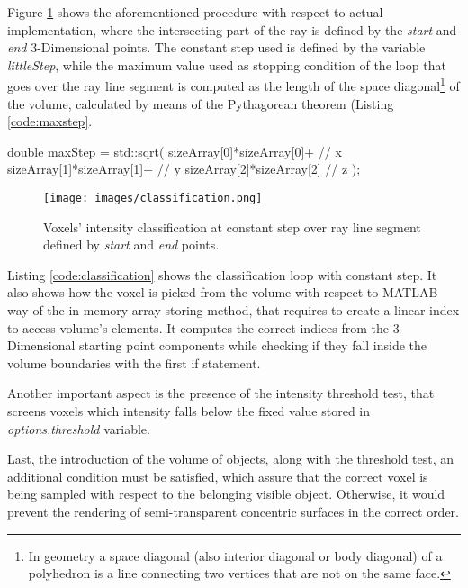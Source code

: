 \documentclass[12pt,a4paper]{extarticle}
\begin{document}
Figure \ref{fig:segmentclassify} shows the aforementioned procedure with respect to actual implementation, where the intersecting part of the ray is defined by the \textit{start} and \textit{end} 3-Dimensional points.
The constant step used is defined by the variable \textit{littleStep}, while the maximum value used as stopping condition of the loop that goes over the ray line segment is computed as the length of the space diagonal\footnote{In geometry a space diagonal (also interior diagonal or body diagonal) of a polyhedron is a line connecting two vertices that are not on the same face.\cite{space_diagonal:6}} of the volume, calculated by means of the Pythagorean theorem (Listing \ref{code:maxstep}.

\begin{cpp}[caption={Computed volume's space diagonal by means of the \textit{"Pythagorean formula"}, where \textit{sizeArray} is an array storing the volume sizes in each 3-Dimensional dimension.},label=code:maxstep]
double maxStep = std::sqrt(
						sizeArray[0]*sizeArray[0]+ // x
						sizeArray[1]*sizeArray[1]+ // y
						sizeArray[2]*sizeArray[2]  // z
						);
\end{cpp}

\begin{figure}[hbtp]
\centering
\texttt{[image: images/classification.png]}
\caption{Voxels' intensity classification at constant step over ray line segment defined by \textit{start} and \textit{end} points.}
\label{fig:segmentclassify}
\end{figure}

Listing \ref{code:classification} shows the classification loop with constant step. It also shows how the voxel is picked from the volume with respect to MATLAB way of the in-memory array storing method, that requires to create a linear index to access volume's elements. It computes the correct indices from the 3-Dimensional starting point components while checking if they fall inside the volume boundaries with the first if statement.

Another important aspect is the presence of the intensity threshold test, that screens voxels which intensity falls below the fixed value stored in \textit{options.threshold} variable.

Last, the introduction of the volume of objects, along with the threshold test, an additional condition must be satisfied, which assure that the correct voxel is being sampled with respect to the belonging visible object. Otherwise, it would prevent the rendering of semi-transparent concentric surfaces in the correct order.
 
\end{document}
